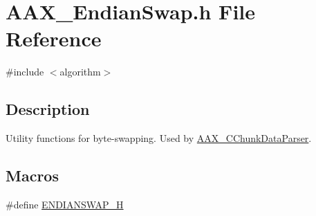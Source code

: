 \hypertarget{a00488}{}\section{A\+A\+X\+\_\+\+Endian\+Swap.\+h File Reference}
\label{a00488}
{\ttfamily \#include $<$algorithm$>$}\newline


\subsection{Description}
Utility functions for byte-\/swapping. Used by \mbox{\hyperlink{a01461}{A\+A\+X\+\_\+\+C\+Chunk\+Data\+Parser}}. 

\subsection*{Macros}
\begin{DoxyCompactItemize}
\item 
\#define \mbox{\hyperlink{a00488_a8bad80e5aaa9c0a227bf53589dfa181b}{E\+N\+D\+I\+A\+N\+S\+W\+A\+P\+\_\+H}}
\end{DoxyCompactItemize}
